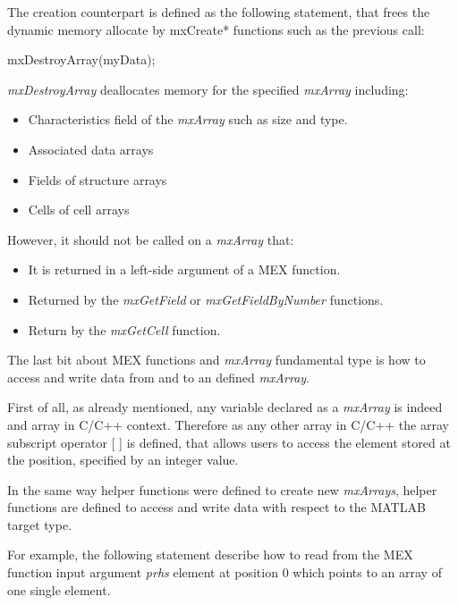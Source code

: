 \documentclass[12pt,a4paper]{extarticle}
\newcommand{\linespace}{\vspace{8pt}}
\begin{document}
The creation counterpart is defined as the following statement, that frees the dynamic memory allocate by mxCreate* functions such as the previous call:

\begin{cpp}[caption={Deallocation of dynamic memory referred by myData \textit{mxArray} pointer, from Listing \ref{code:createmydata}},label=code:mxarraydestroy]
mxDestroyArray(myData);
\end{cpp}

\textit{mxDestroyArray} deallocates memory for the specified \textit{mxArray} including:
\begin{itemize}
\item Characteristics field of the \textit{mxArray} such as size and type.
\item Associated data arrays
\item Fields of structure arrays
\item Cells of cell arrays
\end{itemize}

However, it should not be called on a \textit{mxArray} that:
\begin{itemize}
\item It is returned in a left-side argument of a MEX function.
\item Returned by the \textit{mxGetField} or \textit{mxGetFieldByNumber} functions.
\item Return by the \textit{mxGetCell} function.
\end{itemize}

The last bit about MEX functions and \textit{mxArray} fundamental type is how to access and write data from and to an defined \textit{mxArray}.

First of all, as already mentioned, any variable declared as a \textit{mxArray} is indeed and array in C/C++ context. Therefore as any other array in C/C++ the array subscript operator [ ] is defined, that allows users to access the element stored at the position, specified by an integer value. %
\linespace

In the same way helper functions were defined to create new \textit{mxArrays}, helper functions are defined to access and write data with respect to the MATLAB target type.

For example, the following statement describe how to read from the MEX function input argument \textit{prhs} element at position 0 which points to an array of one single element.
\end{document}
